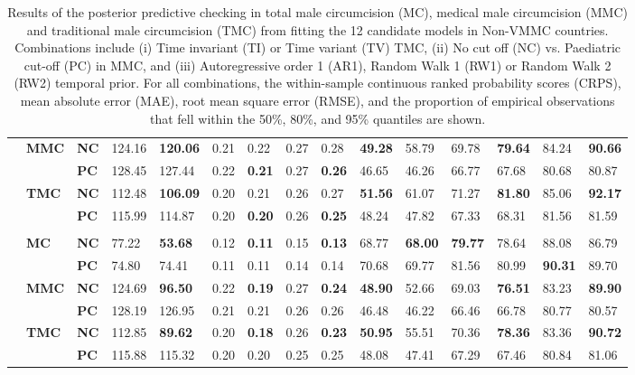 \documentclass{article}
\begin{document}
\begin{landscape}
{\begin{table}[H]
\begin{tabular}{>{\bfseries}p{0.05cm} p{0.85cm} p{0.75cm} C{1.25cm} C{1.25cm} C{1.25cm} C{1.25cm} C{1.25cm} C{1.25cm} C{1.25cm} C{1.25cm} C{1.25cm} C{1.25cm} C{1.25cm} C{1.25cm}}
  & \bf MMC & \bf NC & 124.16 & \bf120.06 &   0.21 &   0.22 &   0.27 &   0.28 & \bf 49.28 &  58.79 &  69.78 & \bf 79.64 &  84.24 & \bf 90.66 & \\ 
  &  & \bf PC & 128.45 & 127.44 &   0.22 & \bf  0.21 &   0.27 & \bf  0.26 &  46.65 &  46.26 &  66.77 &  67.68 &  80.68 &  80.87 & \\[3pt] 
  & \bf TMC & \bf NC & 112.48 & \bf106.09 &   0.20 &   0.21 &   0.26 &   0.27 & \bf 51.56 &  61.07 &  71.27 & \bf 81.80 &  85.06 & \bf 92.17 & \\ 
  &  & \bf PC & 115.99 & 114.87 &   0.20 & \bf  0.20 &   0.26 & \bf  0.25 &  48.24 &  47.82 &  67.33 &  68.31 &  81.56 &  81.59 & \\[3pt] 
     \\ 
 & \bf MC & \bf NC &  77.22 & \bf 53.68 &   0.12 & \bf  0.11 &   0.15 & \bf  0.13 &  68.77 & \bf 68.00 & \bf 79.77 &  78.64 &  88.08 &  86.79 & \\ 
  &  & \bf PC &  74.80 &  74.41 &   0.11 &   0.11 &   0.14 &   0.14 &  70.68 &  69.77 &  81.56 &  80.99 & \bf 90.31 &  89.70 & \\[3pt] 
  & \bf MMC & \bf NC & 124.69 & \bf 96.50 &   0.22 & \bf  0.19 &   0.27 & \bf  0.24 & \bf 48.90 &  52.66 &  69.03 & \bf 76.51 &  83.23 & \bf 89.90 & \\ 
  &  & \bf PC & 128.19 & 126.95 &   0.21 &   0.21 &   0.26 &   0.26 &  46.48 &  46.22 &  66.46 &  66.78 &  80.77 &  80.57 & \\[3pt] 
  & \bf TMC & \bf NC & 112.85 & \bf 89.62 &   0.20 & \bf  0.18 &   0.26 & \bf  0.23 & \bf 50.95 &  55.51 &  70.36 & \bf 78.36 &  83.36 & \bf 90.72 & \\ 
  &  & \bf PC & 115.88 & 115.32 &   0.20 &   0.20 &   0.25 &   0.25 &  48.08 &  47.41 &  67.29 &  67.46 &  80.84 &  81.06 & \\[3pt] 
  \hline 
  \end{tabular} 
  \caption{Results of the posterior predictive checking in total male 
    circumcision (MC), medical male circumcision (MMC) and traditional male 
    circumcision (TMC) from fitting the 12 candidate models in Non-VMMC countries. Combinations include (i) Time invariant (TI) or Time variant (TV) TMC, 
    (ii) No cut off (NC) vs. Paediatric cut-off (PC) in MMC, and (iii) 
    Autoregressive order 1 (AR1), Random Walk 1 (RW1) or Random Walk 2 (RW2) 
    temporal prior. For all combinations, the within-sample continuous ranked 
    probability scores (CRPS), mean absolute error (MAE), root mean square 
    error (RMSE), and the proportion of empirical observations that fell within 
    the 50\%, 80\%, and 95\% quantiles are shown.} 
  \label{tab::PPC2 Non-VMMC} 
\end{table}} 


\end{landscape}
\end{document}
